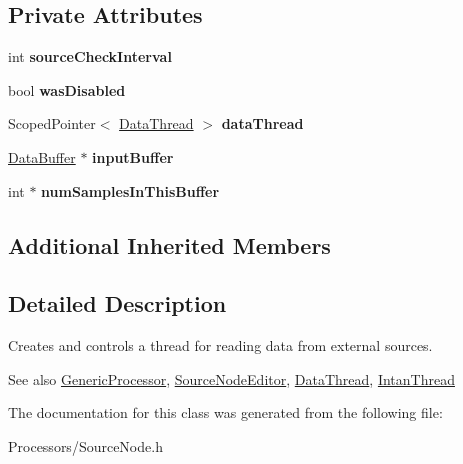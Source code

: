 \subsection*{Private Attributes}
\begin{DoxyCompactItemize}
\item 
\hypertarget{classSourceNode_a41ccf1b5806b6ce87f830120089302b7}{int {\bfseries source\-Check\-Interval}}\label{classSourceNode_a41ccf1b5806b6ce87f830120089302b7}

\item 
\hypertarget{classSourceNode_aa29195288c1bf19bd692e2ef4f44a262}{bool {\bfseries was\-Disabled}}\label{classSourceNode_aa29195288c1bf19bd692e2ef4f44a262}

\item 
\hypertarget{classSourceNode_ae6fb14e27892f11368f1951c7c34b275}{Scoped\-Pointer$<$ \hyperlink{classDataThread}{Data\-Thread} $>$ {\bfseries data\-Thread}}\label{classSourceNode_ae6fb14e27892f11368f1951c7c34b275}

\item 
\hypertarget{classSourceNode_a4fe4bcde50cf6efe07c199a648e5bc6b}{\hyperlink{classDataBuffer}{Data\-Buffer} $\ast$ {\bfseries input\-Buffer}}\label{classSourceNode_a4fe4bcde50cf6efe07c199a648e5bc6b}

\item 
\hypertarget{classSourceNode_a3fbec02fc3223e1e982db3867323538f}{int $\ast$ {\bfseries num\-Samples\-In\-This\-Buffer}}\label{classSourceNode_a3fbec02fc3223e1e982db3867323538f}

\end{DoxyCompactItemize}
\subsection*{Additional Inherited Members}


\subsection{Detailed Description}
Creates and controls a thread for reading data from external sources.

\begin{DoxySeeAlso}{See also}
\hyperlink{classGenericProcessor}{Generic\-Processor}, \hyperlink{classSourceNodeEditor}{Source\-Node\-Editor}, \hyperlink{classDataThread}{Data\-Thread}, \hyperlink{classIntanThread}{Intan\-Thread} 
\end{DoxySeeAlso}


The documentation for this class was generated from the following file\-:\begin{DoxyCompactItemize}
\item 
Processors/Source\-Node.\-h\end{DoxyCompactItemize}
